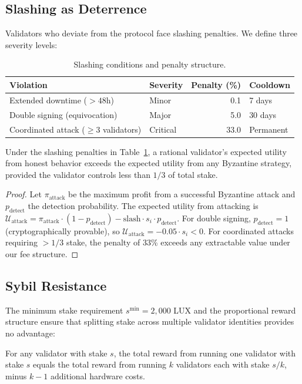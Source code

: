 \subsection{Slashing as Deterrence}

Validators who deviate from the protocol face slashing penalties. We define three severity levels:
\begin{table}[H]
\centering
\caption{Slashing conditions and penalty structure.}
\label{tab:slashing}
\begin{tabular}{llrl}
\toprule
\textbf{Violation} & \textbf{Severity} & \textbf{Penalty (\%)} & \textbf{Cooldown} \\
\midrule
Extended downtime ($> 48$h) & Minor & 0.1 & 7 days \\
Double signing (equivocation) & Major & 5.0 & 30 days \\
Coordinated attack ($\geq 3$ validators) & Critical & 33.0 & Permanent \\
\bottomrule
\end{tabular}
\end{table}

\begin{lemma}
Under the slashing penalties in Table~\ref{tab:slashing}, a rational validator's expected utility from honest behavior exceeds the expected utility from any Byzantine strategy, provided the validator controls less than $1/3$ of total stake.
\end{lemma}

\begin{proof}
Let $\pi_{\text{attack}}$ be the maximum profit from a successful Byzantine attack and $p_{\text{detect}}$ the detection probability. The expected utility from attacking is $\mathcal{U}_{\text{attack}} = \pi_{\text{attack}} \cdot (1 - p_{\text{detect}}) - \text{slash} \cdot s_i \cdot p_{\text{detect}}$. For double signing, $p_{\text{detect}} = 1$ (cryptographically provable), so $\mathcal{U}_{\text{attack}} = -0.05 \cdot s_i < 0$. For coordinated attacks requiring $> 1/3$ stake, the penalty of 33\% exceeds any extractable value under our fee structure.
\end{proof}

\subsection{Sybil Resistance}

The minimum stake requirement $s^{\min} = 2{,}000$ LUX and the proportional reward structure ensure that splitting stake across multiple validator identities provides no advantage:

\begin{proposition}
For any validator with stake $s$, the total reward from running one validator with stake $s$ equals the total reward from running $k$ validators each with stake $s/k$, minus $k-1$ additional hardware costs.
\end{proposition}

